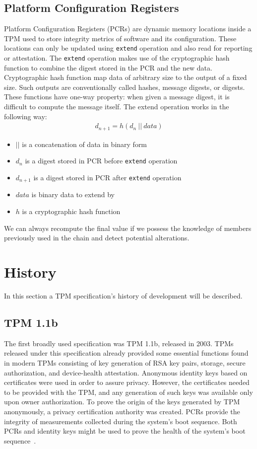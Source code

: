 \subsection{Platform Configuration Registers}
Platform Configuration Registers (PCRs) are dynamic memory locations inside a TPM used to store integrity metrics of software and its configuration. These locations can only be updated using \texttt{extend} operation and also read for reporting or attestation. The \texttt{extend} operation makes use of the cryptographic hash function to combine the digest stored in the PCR and the new data. Cryptographic hash function map data of arbitrary size to the output of a fixed size. Such outputs are conventionally called hashes, message digests, or digests. These functions have one-way property: when given a message digest, it is difficult  to compute the message itself. The extend operation works in the following way:
\begin{align*}
    d_{n+1} = h(d_{n}\ ||\ data)
\end{align*}
\begin{itemize}
    \item $||$ is a concatenation of data in binary form
    \item $ d_{n} $ is a digest stored in PCR before \texttt{extend} operation
    \item $ d_{n+1} $ is a digest stored in PCR after \texttt{extend} operation
    \item $ data $ is binary data to extend by
    \item $ h $ is a cryptographic hash function
\end{itemize}

We can always recompute the final value if we possess the knowledge of members previously used in the chain and detect potential alterations.

\section{History}
In this section a TPM specification's history of development will be described.

\subsection{TPM 1.1b}
The first broadly used specification was TPM 1.1b, released in 2003. TPMs released under this specification already provided some essential functions found in modern TPMs consisting of key generation of RSA key pairs, storage, secure authorization, and device-health attestation. Anonymous identity keys based on certificates were used in order to assure privacy. However, the certificates needed to be provided with the TPM, and any generation of such keys was available only upon owner authorization. To prove the origin of the keys generated by TPM anonymously, a privacy certification authority was created. PCRs provide the integrity of measurements collected during the system's boot sequence. Both PCRs and identity keys might be used to prove the health of the system's boot sequence~\cite[p.~2]{arthur2015practical}.

